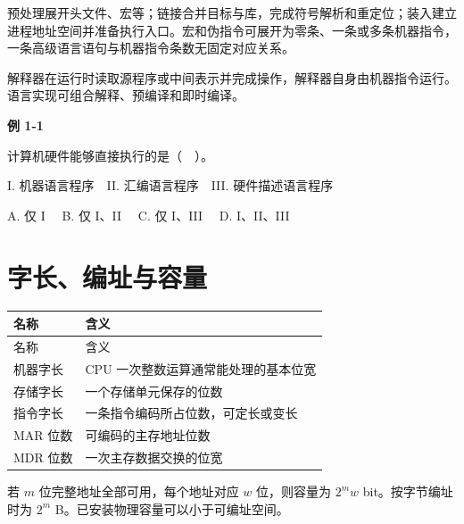 预处理展开头文件、宏等；链接合并目标与库，完成符号解析和重定位；装入建立进程地址空间并准备执行入口。宏和伪指令可展开为零条、一条或多条机器指令，一条高级语言语句与机器指令条数无固定对应关系。

解释器在运行时读取源程序或中间表示并完成操作，解释器自身由机器指令运行。语言实现可组合解释、预编译和即时编译。

\par\medskip{}\noindent\hypertarget{CO01-E01}{}\label{CO01-E01}\textbf{例 1-1}\par\nobreak\smallskip

计算机硬件能够直接执行的是（　）。

I. 机器语言程序　II. 汇编语言程序　III. 硬件描述语言程序

A. 仅 I　 B. 仅 I、II　 C. 仅 I、III　 D. I、II、III

\section{字长、编址与容量}\label{CO01-capacity}

\par\smallskip
{\fontsize{9.3}{12}\selectfont\setlength{\tabcolsep}{2.5pt}\setlength{\LTleft}{0pt}\setlength{\LTright}{0pt}
\begin{longtable}{@{}>{\raggedright\arraybackslash}p{}>{\raggedright\arraybackslash}p{}@{}}
\toprule
名称 & 含义 \\

\midrule\endfirsthead\toprule
名称 & 含义 \\

\midrule\endhead\bottomrule\endfoot
机器字长 & CPU 一次整数运算通常能处理的基本位宽 \\

存储字长 & 一个存储单元保存的位数 \\

指令字长 & 一条指令编码所占位数，可定长或变长 \\

MAR 位数 & 可编码的主存地址位数 \\

MDR 位数 & 一次主存数据交换的位宽 \\

\end{longtable}}
\par\smallskip

若 \(m\) 位完整地址全部可用，每个地址对应 \(w\) 位，则容量为 \(2^m w\) bit。按字节编址时为 \(2^m\) B。已安装物理容量可以小于可编址空间。

